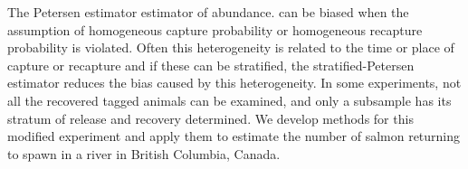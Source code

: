 %
%
%



\def\E{\mathop{\hbox{\rm E}}\nolimits}
















\Summary{}
 
The Petersen estimator estimator of abundance.
can be biased when the assumption of homogeneous capture
probability or homogeneous recapture probability is violated.
Often this heterogeneity is related to the time or place of
capture or recapture and if these can be stratified,
the stratified-Petersen estimator reduces the bias caused by this heterogeneity.
In some experiments, not all the recovered tagged animals can be examined, and 
only a subsample has its stratum of release and recovery determined. 
We develop methods for this modified experiment and apply them
to estimate the number of salmon returning to spawn in a river in
British Columbia, Canada.






